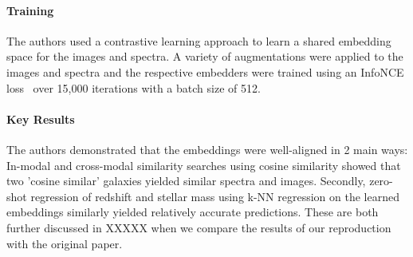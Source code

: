 \paragraph{Training} The authors used a contrastive learning approach to learn a shared embedding space for the images
and spectra.
A variety of augmentations were applied to the images and spectra and the respective embedders were trained using an
InfoNCE loss~\citep{oord2019} over 15,000 iterations with a batch size of 512.

\paragraph{Key Results} The authors demonstrated that the embeddings were well-aligned in 2 main ways:
In-modal and cross-modal similarity searches using cosine similarity showed that two 'cosine similar' galaxies yielded
similar spectra and images.
Secondly, zero-shot regression of redshift and stellar mass using k-NN regression on the learned embeddings similarly
yielded relatively accurate predictions.
These are both further discussed in XXXXX when we compare the results of our reproduction with the original paper.
